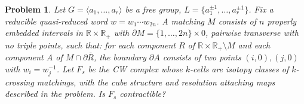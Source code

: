 \documentclass{amsart}
\newtheorem*{problem*}{Problem}
\theoremstyle{definition}
\newcommand{\RR}{\mathbb{R}}
\newcommand{\bdy}{\partial}
\begin{document}
\begin{problem*}
  Let $G=\langle a_1,\dots,a_r\rangle$ be a free group, $L=\{a_1^{\pm1},\dots,a_r^{\pm1}\}$.
  Fix a reducible quasi-reduced word $w=w_1\cdots w_{2n}$.
  A matching $M$ consists of $n$ properly embedded intervals in $\RR\times\RR_+$ with
  $\bdy M=\{1,\dots,2n\}\times 0$, pairwise transverse with no triple points, such that:
  for each component $R$ of $\RR\times\RR_+\setminus M$ and each component $A$ of
  $M\cap\bdy\overline R$, the boundary $\bdy A$ consists of two points $(i,0),(j,0)$ with
  $w_i=w_j^{-1}$.
  Let $F_s$ be the CW complex whose $k$-cells are isotopy classes of $k$-crossing matchings,
  with the cube structure and resolution attaching maps described in the problem.
  Is $F_s$ contractible?
\end{problem*}
\end{document}
